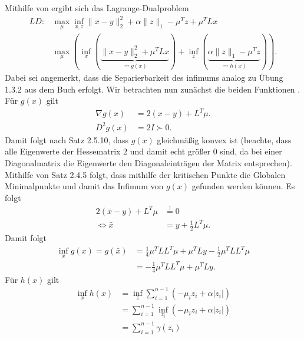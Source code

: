 \documentclass[ngerman, a4paper,12pt]{article}
\begin{document}
Mithilfe von  ergibt sich das Lagrange-Dualproblem
\begin{equation*}
	\begin{split}
	LD: &\max_{\mu} \inf_{x,z} \|x-y\|_2^2+\alpha\|z\|_1 - \mu^Tz + \mu^TLx \\
			&\max_{\mu} \left( \inf_{x} \left( \underbrace{\|x-y\|_2^2 + \mu^TLx}_{\eqqcolon g(x)}  \right) + \inf_{z} \left( 
			\underbrace{\alpha\|z\|_1 - \mu^Tz}_{\eqqcolon h(x)}  \right) \right).
	\end{split}
\end{equation*}
Dabei sei angemerkt, dass die Separierbarkeit des infimums analog zu Übung 1.3.2 aus dem Buch erfolgt. Wir betrachten nun zunächst die beiden Funktionen .
Für $g(x)$ gilt
\begin{equation*}
	\begin{split}
		\nabla g(x) &= 2(x-y) + L^T\mu. \\
		D^2 g(x) &= 2 I \succ 0.
	\end{split}
\end{equation*}
Damit folgt nach Satz 2.5.10, dass $g(x)$ gleichmäßig konvex ist (beachte, dass alle Eigenwerte der Hessematrix $2$ und damit echt größer $0$ sind, da bei einer Diagonalmatrix die Eigenwerte den Diagonaleinträgen der Matrix entsprechen). Mithilfe von Satz 2.4.5 folgt, dass mithilfe der kritischen Punkte die Globalen Minimalpunkte und damit das Infimum von $g(x)$ gefunden werden können. Es folgt
\begin{equation*}
	\begin{split}
	  2( \bar{x}-y)+L^T\mu &\stackrel{!}{=}0 \\
	  \Leftrightarrow \bar{x}&=y+\frac{1}{2} L^T\mu.
	\end{split}
\end{equation*}
Damit folgt 
\begin{equation*}
	\begin{split}
		\inf_x g(x) = g( \bar{x} ) &=\frac{1}{4}\mu^TLL^T\mu+\mu^TLy-\frac{1}{2}\mu^TLL^T\mu \\ &=-\frac{1}{4}\mu^TLL^T\mu+\mu^TLy.
	\end{split}
\end{equation*}
Für $h(x)$ gilt
\begin{equation*}
	\begin{split}
		\inf_x h(x)&=\inf_z \sum_{i=1}^{n-1}( -\mu_iz_i+\alpha|z_i|) \\
		  &= \sum_{i=1}^{n-1} \inf_{z_i} (-\mu_iz_i+\alpha|z_i|) \\
		  &= \sum_{i=1}^{n-1} \gamma (z_i)
		  \end{split}
\end{equation*}
\end{document}
